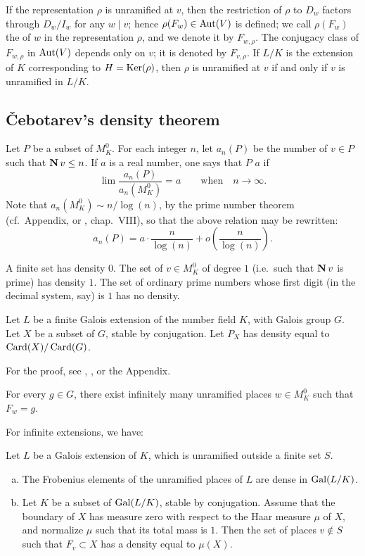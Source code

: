 If the representation $\rho$ is unramified at $v$, then the
\dpage
restriction of $\rho$ to $D_w$ factors through $D_w/I_w$ for any $w\mid v$;
hence $\rho(F_w) \in \operatorname{Aut}(V)$ is defined; we call $\rho(F_w)$ the
 of $w$ in the representation $\rho$, and we denote it by
$F_{w, \rho}$. The conjugacy class of $F_{w, \rho}$ in $\operatorname{Aut}(V)$ depends only
on $v$; it is denoted by $F_{v, \rho}$. If $L/K$ is the extension of $K$
corresponding to $H = \operatorname{Ker}(\rho)$, then $\rho$ is unramified at $v$ if and only
if $v$ is unramified in $L/K$.

\subsection{\v Cebotarev's density theorem}\label{sec:I_22}
Let $P$ be a subset of $M_K^0$. For each integer $n$, let $a_n(P)$
be the number of $v \in P$ such that $\operatorname{\mathbf{N}} v \le n$. If $a$ is a real number,
one says that $P$  $a$ if
\[
	\lim \frac{a_n(P)}{a_n(M_K^0)} = a \qquad \text{when}\quad n \to \infty.
\]
Note that $a_n(M_K^0) \sim n/\log(n)$, by the prime number theorem (cf.\
Appendix, or \cite{13}, chap.~VIII), so that the above relation may be
rewritten:
\[
	a_n(P) = a \cdot \frac{n}{\log(n)} + o \left(\frac{n}{\log(n)}\right).
\]
\begin{ex}
A finite set has density $0$. The set of $v \in M_K^0$ of degree $1$ (i.e.\ such
that $\operatorname{\mathbf{N}} v$ is prime) has density $1$. The set of ordinary prime numbers
whose first digit (in the decimal system, say) is $1$ has no density.
\end{ex}

\begin{thm}\label{thm-chebotarev}
Let $L$ be a finite Galois extension of the number field $K$, with Galois group
$G$. Let $X$ be a subset of $G$, stable by
\dpage
conjugation. Let $P_X$ has density equal to $\operatorname{Card}(X)/\operatorname{Card}(G)$. 
\end{thm}
For the proof, see \cite{7}, \cite{1}, or the Appendix.

\begin{cor}
For every $g \in G$, there exist infinitely many unramified places $w \in
M_K^0$ such that $F_w = g$.
\end{cor}

For infinite extensions, we have:
\begin{cor}
Let $L$ be a Galois extension of $K$, which is unramified outside a finite set
$S$.
\begin{enumerate}[a)]
\item The Frobenius elements of the unramified places of $L$ are dense in
	$\operatorname{Gal}(L/K)$.
\item Let $K$ be a subset of $\operatorname{Gal}(L/K)$, stable by conjugation. Assume that
	the boundary of $X$ has measure zero with respect to the Haar measure
	$\mu$ of $X$, and normalize $\mu$ such that its total mass is $1$. Then
	the set of places $v \not\in S$ such that $F_v \subset X$ has a density
	equal to $\mu(X)$.
\end{enumerate}
\end{cor}

